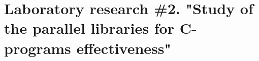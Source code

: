 { %
	\section{Laboratory research \#2. "Study of the parallel libraries for C-programs effectiveness"{}}
	
	
	
}

